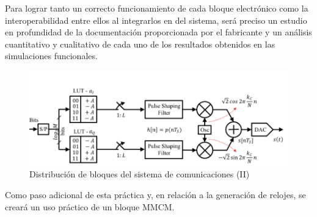\vspace{3mm}

Para lograr tanto un correcto funcionamiento de cada bloque electrónico como la interoperabilidad entre ellos al integrarlos en del sistema, será preciso un estudio en profundidad de la documentación proporcionada por el fabricante y un análisis cuantitativo y cualitativo de cada uno de los resultados obtenidos en las simulaciones funcionales. 

\begin{figure}[h]
    \centering
    \includegraphics[width=1\textwidth]{img/diseno/sistema2.PNG}
    \caption{Distribución de bloques del sistema de comunicaciones (II)}
    \label{fig:sistema2}
\end{figure}

\vspace{3mm}
    
Como paso adicional de esta práctica y, en relación a la generación de relojes, se creará un uso práctico de un bloque MMCM.







